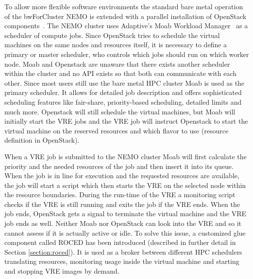 To allow more flexible software environments the standard bare metal
operation of the bwForCluster NEMO is extended with a parallel installation of OpenStack
components~\cite{hpc-symp:2016}.
The NEMO cluster uses Adaptive's Moab Workload Manager~\cite{Moab} as a
scheduler of compute jobs.
Since OpenStack tries to schedule the virtual machines on the same nodes and
resources itself, it is necessary to define a primary or master scheduler, who
controls which jobs should run on which worker node. Moab and Openstack are
unaware that there exists another scheduler within the cluster and no API exists
so that both can communicate with each other. Since most users still use the
bare metal HPC cluster Moab is used as the primary scheduler. It allows for
detailed job description and offers sophisticated scheduling features like
fair-share, priority-based scheduling, detailed limits and much more. Openstack
will still schedule the virtual machines, but Moab will initially start the VRE
jobs and the VRE job will instruct Openstack to start the virtual machine on the
reserved resources and which flavor to use (resource definition in OpenStack).

When a VRE job is submitted to the NEMO cluster Moab will first calculate the
priority and the needed resources of the job and then insert it into its queue.
When the job is in line for execution and the requested resources are available,
the job will start a script which then starts the VRE on the selected node
within the resource boundaries. During the run-time of the VRE a monitoring
script checks if the VRE is still running and exits the job if the VRE ends.
When the job ends, OpenStack gets a signal to terminate the virtual machine and
the VRE job ends as well.  Neither Moab nor OpenStack can look into the VRE and
so it cannot assess if it is actually active or idle. To solve this issue, a
customized glue component called ROCED has been introduced (described in
further detail in Section \ref{section:roced}).  It is used as a broker between
different HPC schedulers translating resources, monitoring usage inside the
virtual machine and starting and stopping VRE images by demand.

